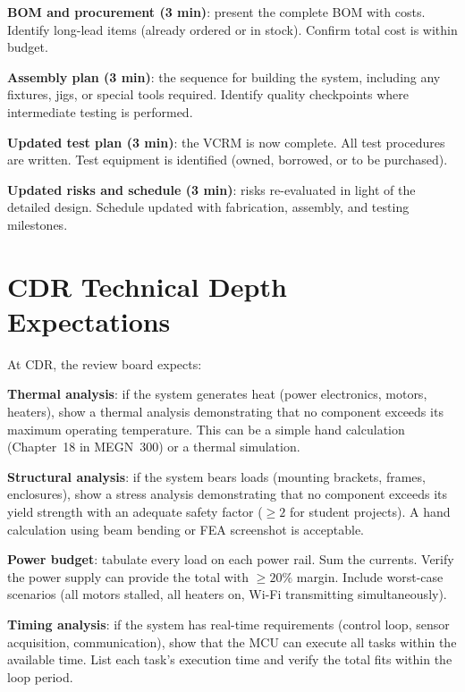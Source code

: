 \textbf{BOM and procurement (3 min)}: present the complete BOM with costs. Identify long-lead items (already ordered or in stock). Confirm total cost is within budget.

\textbf{Assembly plan (3 min)}: the sequence for building the system, including any fixtures, jigs, or special tools required. Identify quality checkpoints where intermediate testing is performed.

\textbf{Updated test plan (3 min)}: the VCRM is now complete. All test procedures are written. Test equipment is identified (owned, borrowed, or to be purchased).

\textbf{Updated risks and schedule (3 min)}: risks re-evaluated in light of the detailed design. Schedule updated with fabrication, assembly, and testing milestones.

\section{CDR Technical Depth Expectations}
At CDR, the review board expects:

\textbf{Thermal analysis}: if the system generates heat (power electronics, motors, heaters), show a thermal analysis demonstrating that no component exceeds its maximum operating temperature. This can be a simple hand calculation (Chapter~18 in MEGN~300) or a thermal simulation.

\textbf{Structural analysis}: if the system bears loads (mounting brackets, frames, enclosures), show a stress analysis demonstrating that no component exceeds its yield strength with an adequate safety factor ($\geq 2$ for student projects). A hand calculation using beam bending or FEA screenshot is acceptable.

\textbf{Power budget}: tabulate every load on each power rail. Sum the currents. Verify the power supply can provide the total with $\geq 20\%$ margin. Include worst-case scenarios (all motors stalled, all heaters on, Wi-Fi transmitting simultaneously).

\textbf{Timing analysis}: if the system has real-time requirements (control loop, sensor acquisition, communication), show that the MCU can execute all tasks within the available time. List each task's execution time and verify the total fits within the loop period.

